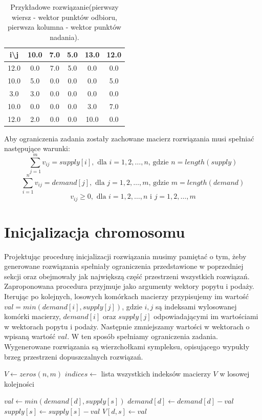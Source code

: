 \begin{table}[h!]
    \begin{center}
        \begin{tabular}{c|ccccc}
            i\textbackslash{j} & 10.0 & 7.0 & 5.0 & 13.0 & 12.0 \\ 
            \hline
            12.0 & 0.0 & 7.0 & 5.0 & 0.0 & 0.0 \\
            10.0 & 5.0 & 0.0 & 0.0 & 0.0 & 5.0 \\
            3.0 & 3.0 & 0.0 & 0.0 & 0.0 & 0.0 \\
            10.0 & 0.0 & 0.0 & 0.0 & 3.0 & 7.0 \\
            12.0 & 2.0 & 0.0 & 0.0 & 10.0 & 0.0 \\
        \end{tabular}
    \end{center}
    \caption{Przykładowe rozwiązanie(pierwszy wiersz - wektor punktów odbioru, pierwsza kolumna - wektor punktów nadania).}
\end{table}

Aby ograniczenia zadania zostały zachowane macierz rozwiązania musi spełniać następujące warunki:
$$\sum_{j=1}^{m} v_{ij} = supply[i], \text{ dla } i = 1, 2, \dots, n \text{, gdzie } n = length(supply)$$
$$\sum_{i=1}^{n} v_{ij} = demand[j], \text{ dla } j = 1, 2, \dots, m \text{, gdzie } m = length(demand)$$
$$v_{ij} \ge 0, \text{ dla } i = 1, 2, \dots, n \text{ i } j = 1, 2, \dots, m$$


\section{Inicjalizacja chromosomu}
Projektując procedurę inicjalizacji rozwiązania musimy pamiętać o tym, żeby generowane rozwiązania spełniały ograniczenia przedstawione 
w poprzedniej sekcji oraz obejmowały jak największą część przestrzeni wszystkich rozwiązań. Zaproponowana procedura przyjmuje jako argumenty 
wektory popytu i podaży. Iterując po kolejnych, losowych komórkach macierzy przypisujemy im wartość $val = min(demand[i], supply[j])$, gdzie 
$i, j$ są indeksami wylosowanej komórki macierzy, $demand[i]$ oraz $supply[j]$ odpowiadającymi im wartościami w wektorach popytu i podaży. 
Następnie zmniejszamy wartości w wektorach o wpisaną wartość $val$. W ten sposób spełniamy ograniczenia zadania. Wygenerowane rozwiązania są 
wierzchołkami sympleksu, opisującego wypukły brzeg przestrzeni dopuszczalnych rozwiązań.

\begin{pseudokod}
    \caption{Procedura inicjalizacji chromosomu}
    $V \gets zeros(n, m)$
    $indices \gets$ lista wszystkich indeksów macierzy $V$ w losowej kolejności\;
    
     {
        $val \gets min(demand[d], supply[s])$\;
        $demand[d] \gets demand[d] - val$\;
        $supply[s] \gets supply[s] - val$\;
        $V[d, s] \gets val$\;
    }

\end{pseudokod}

